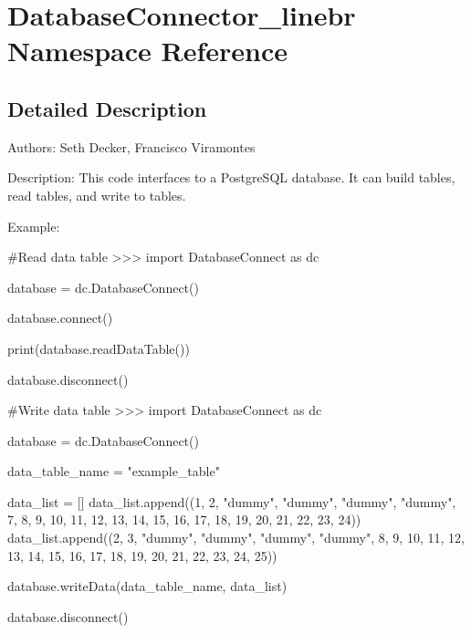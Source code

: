 \hypertarget{namespaceDatabaseConnector__linebr}{}\section{Database\+Connector\+\_\+linebr Namespace Reference}
\label{namespaceDatabaseConnector__linebr}


\subsection{Detailed Description}
\begin{DoxyVerb}Authors: Seth Decker, Francisco Viramontes

Description: This code interfaces to a PostgreSQL database. It can build tables, 
read tables, and write to tables.


Example:

    #Read data table
>>> import DatabaseConnect as dc
    
    database = dc.DatabaseConnect()
    
    database.connect()
    
    print(database.readDataTable())
    
    database.disconnect()


    #Write data table
>>> import DatabaseConnect as dc
    
    database = dc.DatabaseConnect()
    
    data_table_name = "example_table"

    data_list = []
    data_list.append((1, 2, "dummy", "dummy", "dummy", "dummy", 7, 8, 9, 10, 11, 12, 13, 14, 15, 16, 17, 18, 19, 20, 21, 22, 23, 24))  
    data_list.append((2, 3, "dummy", "dummy", "dummy", "dummy", 8, 9, 10, 11, 12, 13, 14, 15, 16, 17, 18, 19, 20, 21, 22, 23, 24, 25))

    database.writeData(data_table_name, data_list)

    database.disconnect()\end{DoxyVerb}
 